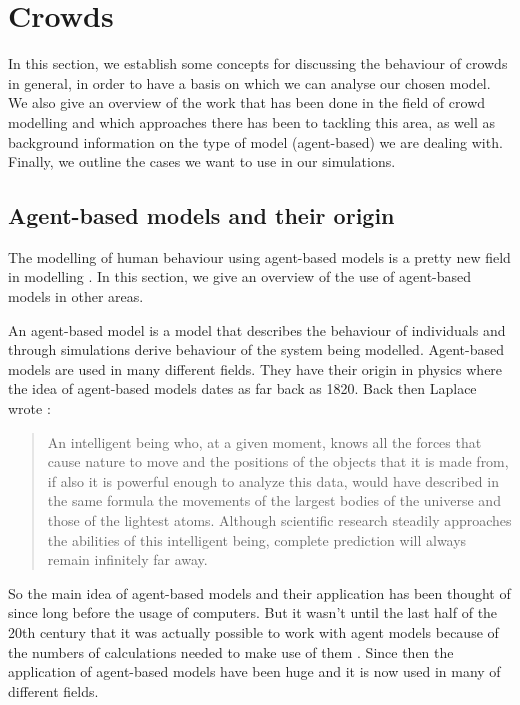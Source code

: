\section{Crowds}
\label{sec:crowds}
In this section, we establish some concepts for discussing the behaviour of 
crowds in general, in order to have a basis on which we can analyse our chosen 
model. We also give an overview of the work that has been done in the field of 
crowd modelling and which approaches there has been to tackling this area, as 
well as background information on the type of model (agent-based) we are 
dealing with. Finally, we outline the cases we want to use in our simulations.

\subsection{Agent-based models and their origin}
The modelling of human behaviour using agent-based models is a 
pretty new field in modelling \cite{helbing00}. In this section, we give an 
overview of the use of agent-based models in other areas.

An agent-based model is a model that describes the behaviour of individuals 
and through simulations derive behaviour of the system being modelled.  
Agent-based models are used in many different fields.  They have their origin 
in physics where the idea of agent-based models dates as far back as 1820. 
Back then Laplace wrote \cite{simintro}:


\begin{quote}
    An intelligent being who, at a given moment, knows all the forces that 
    cause nature to move and the positions of the objects that it is made 
    from, if also it is powerful enough to analyze this data, would have 
    described in the same formula the movements of the largest bodies of the 
    universe and those of the lightest atoms. Although scientific research 
    steadily approaches the abilities of this intelligent being, complete 
    prediction will always remain infinitely far away.
\end{quote}

So the main idea of agent-based models and their application has been thought 
of since long before the usage of computers. But it wasn't until the last half 
of the 20th century that it was actually possible to work with agent models 
because of the numbers of calculations needed to make use of 
them \cite{simintro}.  Since then the application of agent-based models have 
been huge and it is now used in many of different fields. 

